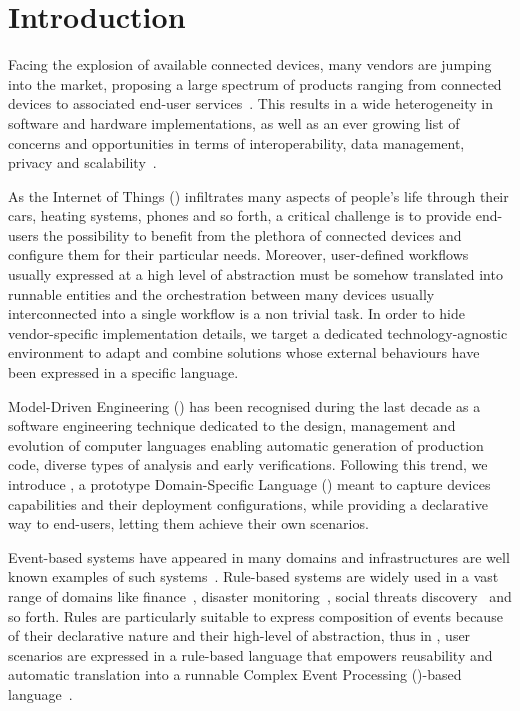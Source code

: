 \section{Introduction}
\label{sec:Introduction}

Facing the explosion of available connected devices, many vendors are jumping into the market, proposing a large spectrum of products ranging from connected devices to associated end-user services~\cite{lee-15}. This results in a wide heterogeneity in software and hardware implementations, as well as an ever growing list of concerns and opportunities in terms of interoperability, data management, privacy and scalability~\cite{chaqfeh-12}.

As the Internet of Things (\IOT) infiltrates many aspects of people's life through their cars, heating systems, phones and so forth, a critical challenge is to provide end-users the possibility to benefit from the plethora of connected devices and configure them for their particular needs. Moreover, user-defined workflows usually expressed at a high level of abstraction must be somehow translated into runnable entities and the orchestration between many devices usually interconnected into a single workflow is a non trivial task. In order to hide vendor-specific implementation details, we target a dedicated technology-agnostic environment to adapt and combine \IOT solutions whose external behaviours have been expressed in a specific language.

Model-Driven Engineering (\MDE) has been recognised during the last decade as a software engineering technique dedicated to the design, management and evolution of computer languages enabling automatic generation of production code, diverse types of analysis and early verifications. Following this trend, we introduce \IOTDSL, a prototype Domain-Specific Language (\DSL) meant to capture \IOT devices capabilities and their deployment configurations, while providing a declarative way to end-users, letting them achieve their own scenarios. 

Event-based systems have appeared in many domains and \IOT infrastructures are well known examples of such systems~\cite{muhl-06,cristea-11}. Rule-based systems are widely used in a vast range of domains like finance~\cite{schultz-09}, disaster monitoring~\cite{broda-09}, social threats discovery~\cite{baran-13} and so forth. Rules are particularly suitable to express composition of events because of their declarative nature and their high-level of abstraction, thus in \IOTDSL, user scenarios are expressed in a rule-based language that empowers reusability and automatic translation into a runnable Complex Event Processing (\CEP)-based language~\cite{cugola-12}.

